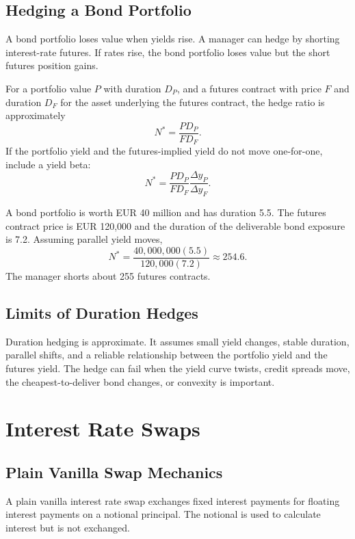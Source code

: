 \subsection{Hedging a Bond Portfolio}

A bond portfolio loses value when yields rise. A manager can hedge by shorting
interest-rate futures. If rates rise, the bond portfolio loses value but the
short futures position gains.

For a portfolio value $P$ with duration $D_P$, and a futures contract with price
$F$ and duration $D_F$ for the asset underlying the futures contract, the hedge
ratio is approximately
\[
    N^*=\frac{P D_P}{F D_F}.
\]
If the portfolio yield and the futures-implied yield do not move one-for-one,
include a yield beta:
\[
    N^*=\frac{P D_P}{F D_F}
    \frac{\Delta y_P}{\Delta y_F}.
\]

\begin{exmp}
A bond portfolio is worth EUR 40 million and has duration 5.5. The futures
contract price is EUR 120,000 and the duration of the deliverable bond exposure
is 7.2. Assuming parallel yield moves,
\[
    N^*=\frac{40{,}000{,}000(5.5)}
    {120{,}000(7.2)}
    \approx 254.6.
\]
The manager shorts about 255 futures contracts.
\end{exmp}

\subsection{Limits of Duration Hedges}

Duration hedging is approximate. It assumes small yield changes, stable
duration, parallel shifts, and a reliable relationship between the portfolio
yield and the futures yield. The hedge can fail when the yield curve twists,
credit spreads move, the cheapest-to-deliver bond changes, or convexity is
important.

\section{Interest Rate Swaps}

\subsection{Plain Vanilla Swap Mechanics}

A plain vanilla interest rate swap exchanges fixed interest payments for
floating interest payments on a notional principal. The notional is used to
calculate interest but is not exchanged.

